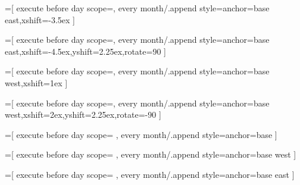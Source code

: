 %
%

=[%
  execute before day scope={},
  every month/.append style={anchor=base east,xshift=-3.5ex}
]

=[%
  execute before day scope={},
  every month/.append style={anchor=base east,xshift=-4.5ex,yshift=2.25ex,rotate=90}
]
  
=[%
execute before day scope={},
  every month/.append style={anchor=base west,xshift=1ex}
]

=[%
  execute before day scope={},
  every month/.append style={anchor=base west,xshift=2ex,yshift=2.25ex,rotate=-90}
]

=[%
  execute before day scope={%
    },
  every month/.append style={anchor=base}
]
  
=[%
  execute before day scope={%
    },
  every month/.append style={anchor=base west}
]



=[%
  execute before day scope={%
    },
  every month/.append style={anchor=base east}
]
  
